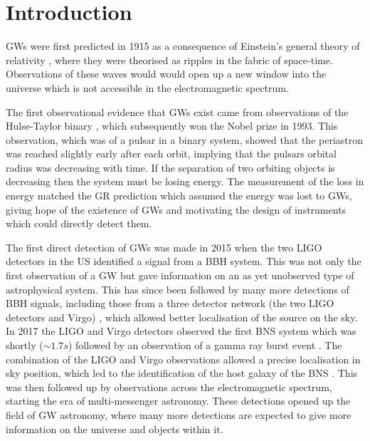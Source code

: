 \chapter{\label{intro}Introduction}


\Glspl{GW} were first predicted in 1915 as a consequence of Einstein's general
theory of relativity \citep{einstein2005GrundlageAllgemeinen}, where they were
theorised as ripples in the fabric of space-time.  Observations of these waves would would open up a new window into the universe which is not accessible in the electromagnetic spectrum.

The first observational evidence that \glspl{GW} exist came from observations of the Hulse-Taylor
binary \citep{weisberg1981GravitationalWaves,weisberg2004RelativisticBinary}, which subsequently won the Nobel prize in 1993.
This observation, which was of a pulsar in a binary system, showed that the periastron was
reached slightly early after each orbit, implying that the pulsars orbital radius was
decreasing with time.  If the separation of two orbiting objects is decreasing
then the system must be losing energy.  The measurement of the loss in energy matched the \gls{GR}
prediction which assumed the energy was lost to \glspl{GW}, giving hope of
the existence of \glspl{GW} and motivating the design of instruments
which could directly detect them.

The first direct detection of \glspl{GW} was made in 2015 when the two \gls{LIGO} detectors in the US
\citep{abbott2016ObservationGravitational} identified a signal from a \gls{BBH}
system.  This was not only the first observation of a \gls{GW} but gave
information on an as yet unobserved type of astrophysical
system.  This has since been followed by many more detections of \gls{BBH}
signals, including those from a three detector network (the two \gls{LIGO} detectors and Virgo)
\citep{abbott2017GW170814ThreeDetector,theligoscientificcollaboration2020GW190425Observation}, which allowed better localisation of the source on the sky.  
In 2017 the \gls{LIGO} and Virgo detectors observed the
first \gls{BNS} system \citep{abbott2017GW170817Observation} which was shortly ($\sim 1.7s$) followed by an observation of a gamma ray burst event \citep{goldstein2017OrdinaryShort}.
The combination of the \gls{LIGO} and Virgo observations allowed a precise localisation in sky position, which led to the identification of the host galaxy of the \gls{BNS} \citep{coulter2017SwopeSupernova}.
This was then followed up by observations across the electromagnetic spectrum, starting the era of multi-messenger astronomy.  
These detections opened up the field of
\gls{GW} astronomy, where many more detections are expected to give more
information on the universe and objects within it.


